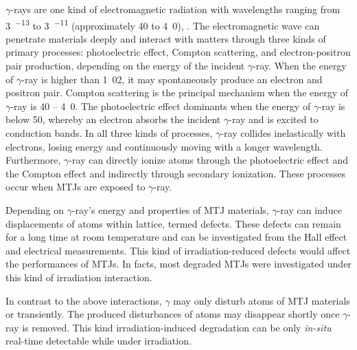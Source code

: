\documentclass[molecules,review,submit,pdftex,moreauthors]{Definitions/mdpi}
\begin{document}
$\gamma$-rays are one kind of electromagnetic radiation with wavelengths ranging from \unit{3 ^{-13}}{\meter} to \unit{3 ^{-11}}{\meter} (approximately \unit{40}{\kilo\electronvolt} to \unit{4.0}{\mega\electronvolt}), .  The electromagnetic wave can penetrate materials deeply and interact with matters through three kinds of primary processes: photoelectric effect, Compton scattering, and electron-positron pair production, depending on the energy of the incident $\gamma$-ray.  When the energy of $\gamma$-ray is higher than \unit{1.02}{\mega\electronvolt}, it may spontaneously produce an electron and positron pair.  Compton scattering is the principal mechanism when the energy of $\gamma$-ray is \unit{40}{\kilo\electronvolt} -- \unit{4.0}{\mega\electronvolt}.  The photoelectric effect dominants when the energy of $\gamma$-ray is below \unit{50}{\kilo\electronvolt}, whereby an electron absorbs the incident $\gamma$-ray and is excited to conduction bands.  In all three kinds of processes, $\gamma$-ray collides inelastically with electrons, losing energy and continuously moving with a longer wavelength.  Furthermore, $\gamma$-ray can directly ionize atoms through the photoelectric effect and the Compton effect and indirectly through secondary ionization.  These processes occur when MTJs are exposed to $\gamma$-ray.


Depending on $\gamma$-ray's energy and properties of MTJ materials, $\gamma$-ray can induce displacements of atoms within lattice, termed defects.  These defects can remain for a long time at room temperature and can be investigated from the Hall effect and electrical measurements.  This kind of irradiation-reduced defects would affect the performances of MTJs.  %
In facts, most degraded MTJs were investigated under this kind of irradiation interaction. 


In contrast to the above interactions, $\gamma$ may only disturb atoms of MTJ materials  or transiently.  The produced disturbances of atoms may disappear shortly once $\gamma$-ray is removed.  This kind irradiation-induced degradation can be only \textit{in-situ} real-time detectable while under irradiation.  
\end{document}
